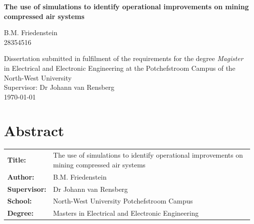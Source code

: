 \documentclass[12pt, english, oneside, open=any]{report}
\begin{document}
	
\begin{titlepage}
	\BgThispage	
		\vspace{0cm}
		\begin{center}
			\textbf{\singlespacing\huge{The use of simulations  to identify operational improvements on mining compressed air systems}\\
			}\par
			\vspace{3cm}
			\LARGE{B.M. Friedenstein \\28354516}\\
		\end{center}
	
	\vspace{2cm}
	
\begin{flushleft}
	{\singlespacing\centering \large Dissertation submitted in fulfilment of the requirements for the degree {\color{blue} \textit{Magister}} in {\color{blue}Electrical and Electronic Engineering} at the Potchefstroom Campus of the North-West University\\
	}
	\vspace{2cm}
	{\large \setlength{\parindent}{0.5cm} Supervisor: Dr Johann van Rensberg \\
	\vspace{2cm}
	\large{\monthyeardate\today}\\		
	}
\end{flushleft}
\end{titlepage}
\clearpage
\section*{Abstract}
	\vspace{0.2cm}
	\thispagestyle{plain}
	\setcounter{page}{2}
	\begin{tabular}{p{2.35cm}p{13cm}}
		\textbf{Title:} & The use of simulations to identify operational improvements on mining compressed air systems  \\
		\textbf{Author:} & B.M. Friedenstein \\
		\textbf{Supervisor:} & Dr Johann van Rensberg \\
		\textbf{School:} & North-West University Potchefstroom Campus\\
		\textbf{Degree:} & Masters in Electrical and Electronic Engineering \\
	\end{tabular}
	\vspace{1cm}
\end{document}
